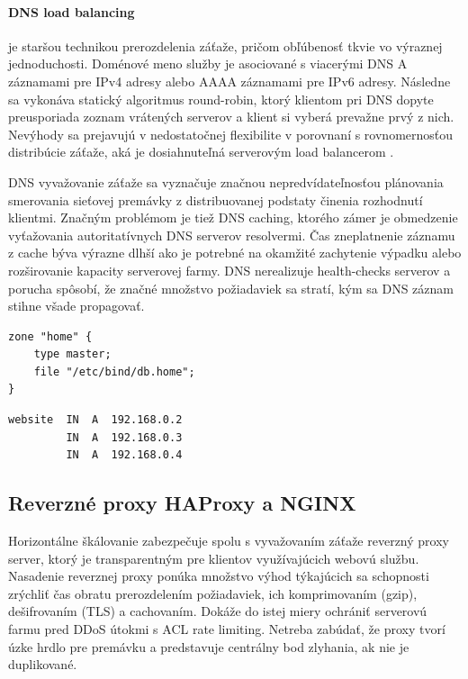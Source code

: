 \documentclass[12pt, a4paper]{article}
\begin{document}
\paragraph{DNS load balancing} je staršou technikou prerozdelenia záťaže, pričom obľúbenosť tkvie vo 
výraznej jednoduchosti. Doménové meno služby je asociované s viacerými DNS A záznamami pre IPv4 adresy 
alebo AAAA záznamami pre IPv6 adresy. Následne sa vykonáva statický algoritmus round-robin, ktorý
klientom pri DNS dopyte preusporiada zoznam vrátených serverov a klient si vyberá prevažne prvý z nich. 
Nevýhody sa prejavujú v nedostatočnej flexibilite v porovnaní s rovnomernosťou distribúcie záťaže, aká je 
dosiahnuteľná serverovým load balancerom \cite{server-load-balancing}. 

DNS vyvažovanie záťaže sa vyznačuje značnou nepredvídateľnosťou plánovania smerovania 
sieťovej premávky z distribuovanej podstaty činenia rozhodnutí klientmi. Značným problémom je tiež DNS 
caching, ktorého zámer je obmedzenie vyťažovania autoritatívnych DNS serverov resolvermi. Čas zneplatnenie 
záznamu z cache býva výrazne dlhší ako je potrebné  na okamžité zachytenie výpadku alebo rozširovanie 
kapacity serverovej farmy. DNS nerealizuje health-checks serverov a porucha spôsobí, že značné množstvo 
požiadaviek sa stratí, kým sa DNS záznam stihne všade propagovať.

\noindent\begin{minipage}{.48\textwidth}
\begin{lstlisting}[caption=BIND9: nastavenie DNS zóny .home]
zone "home" {
    type master;
    file "/etc/bind/db.home";
}
\end{lstlisting}
\end{minipage}\hfill
\begin{minipage}{.48\textwidth}
\begin{lstlisting}[caption=Priradenie troch DNS A záznamov pre doménu website.home]
website  IN  A  192.168.0.2
         IN  A  192.168.0.3
         IN  A  192.168.0.4
\end{lstlisting}
\end{minipage}

\subsection{Reverzné proxy HAProxy a NGINX}
Horizontálne škálovanie zabezpečuje spolu s vyvažovaním záťaže reverzný proxy server, ktorý je 
transparentným pre klientov využívajúcich webovú službu. Nasadenie reverznej proxy ponúka množstvo výhod 
týkajúcich sa schopnosti zrýchliť čas obratu prerozdelením požiadaviek, ich komprimovaním (gzip), 
dešifrovaním (TLS) a cachovaním. Dokáže do istej miery ochrániť serverovú farmu pred DDoS útokmi s ACL rate 
limiting. Netreba zabúdať, že proxy tvorí úzke hrdlo pre premávku a predstavuje 
centrálny bod zlyhania, ak nie je duplikované.
\end{document}
